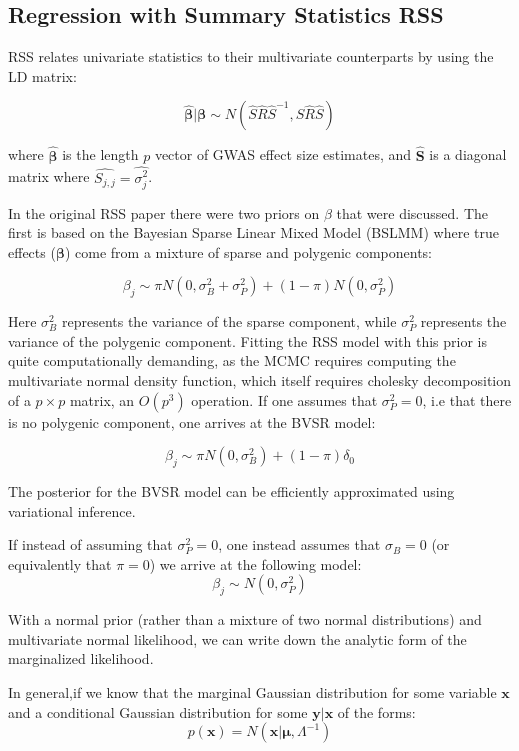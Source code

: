 {\subsection{Regression with Summary Statistics RSS}\label{sec:orgb0b15e2}

RSS relates univariate statistics to their multivariate counterparts by using the LD matrix:

$$ \hat{\boldsymbol{\beta}} | \boldsymbol{\beta} \sim N(\hat{S}\hat{R}\hat{S}^{-1},\hat{S}\hat{R}\hat{S}) $$

where \(\hat{\boldsymbol{\beta}}\) is the length $p$ vector of GWAS effect size estimates, and $\hat{\textbf{S}}$ is a diagonal matrix where $\hat{S_{j,j}}=\hat{\sigma_j^2}$.

In the original RSS paper there were two priors on \(\beta\) that were discussed.  The first is based on the Bayesian Sparse Linear Mixed Model (BSLMM) \cite{bslmm} where true effects ($\boldsymbol{\beta}$)
come from a mixture of sparse and polygenic components:

$$ \beta_j \sim \pi N(0,\sigma^2_B+\sigma^2_P)+(1-\pi) N(0,\sigma^2_P) $$

Here \(\sigma^2_B\) represents the variance of the sparse component, while \(\sigma^2_P\) represents the variance of the polygenic component. Fitting the RSS model with this prior is quite computationally demanding, 
as the MCMC requires computing the multivariate normal density function, which itself requires cholesky decomposition of a \(p \times p\) matrix, an \(O(p^3)\) operation.  If one assumes that \(\sigma^2_P=0\),
i.e that there is no polygenic component, one arrives at the BVSR model:

$$ \beta_j \sim \pi N(0,\sigma^2_B)+(1-\pi) \delta_0 $$

The posterior for the BVSR model can be efficiently approximated using variational inference. 

If instead of assuming that \(\sigma^2_P=0\), one instead assumes that \(\sigma_B=0\) (or equivalently that \(\pi=0\)) we arrive at the following model: 
$$ \beta_j \sim N(0,\sigma^2_P)$$

With a normal prior (rather than a mixture of two normal distributions) and multivariate normal likelihood, we can write down the analytic form of the marginalized likelihood\cite{patternrecognition}.

In general,if we know that the marginal Gaussian distribution for some variable \(\textbf{x}\) and a conditional Gaussian distribution for some \(\textbf{y}|\textbf{x}\) of the forms:
$$p(\textbf{x}) = N(\textbf{x}|\boldsymbol{\mu},\Lambda^{-1})$$

}
